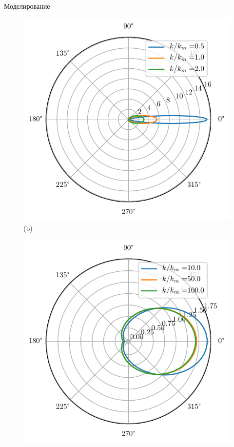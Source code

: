 \begin{frame}[t]{}
\begin{columns}[t]
\begin{column}{.48\linewidth}
\begin{block}{Моделирование}
\begin{figure}[h]
\begin{minipage}{0.32\linewidth}
                \includegraphics[width=\linewidth]{fig/full_angles1}
                \centering
                (b)
            \end{minipage}
            \begin{minipage}{0.32\linewidth}
                \includegraphics[width=\linewidth]{fig/full_angles2}

\end{minipage}
\end{figure}
\end{block}
\end{column}
\end{columns}
\end{frame}
